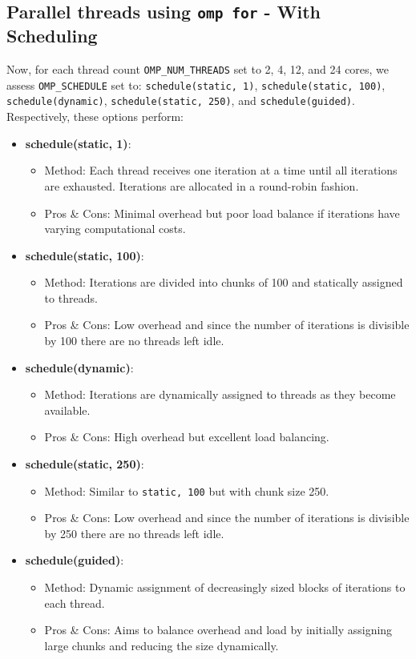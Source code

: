 \documentclass{article}
\begin{document}
\subsection{Parallel threads using \texttt{omp for} - With Scheduling}
Now, for each thread count \texttt{OMP\_NUM\_THREADS} set to 2, 4, 12, and 24 cores, we assess \texttt{OMP\_SCHEDULE} set to: 
\texttt{schedule(static, 1)}, \texttt{schedule(static, 100)}, \texttt{schedule(dynamic)}, \texttt{schedule(static, 250)}, and \texttt{schedule(guided)}. Respectively, 
these options perform:
\begin{itemize}

\item \textbf{schedule(static, 1)}:
  \begin{itemize}
    \item Method: Each thread receives one iteration at a time until all iterations are exhausted. Iterations are allocated in a round-robin fashion.
    \item Pros \& Cons: Minimal overhead but poor load balance if iterations have varying computational costs.
  \end{itemize}

\item \textbf{schedule(static, 100)}:
  \begin{itemize}
    \item Method: Iterations are divided into chunks of 100 and statically assigned to threads.
    \item Pros \& Cons: Low overhead and since the number of iterations is divisible by 100 there are no threads left idle.
  \end{itemize}

\item \textbf{schedule(dynamic)}:
  \begin{itemize}
    \item Method: Iterations are dynamically assigned to threads as they become available.
    \item Pros \& Cons: High overhead but excellent load balancing.
  \end{itemize}

\item \textbf{schedule(static, 250)}:
  \begin{itemize}
    \item Method: Similar to \texttt{static, 100} but with chunk size 250.
    \item Pros \& Cons: Low overhead and since the number of iterations is divisible by 250 there are no threads left idle.
  \end{itemize}

\item \textbf{schedule(guided)}:
  \begin{itemize}
    \item Method: Dynamic assignment of decreasingly sized blocks of iterations to each thread.
    \item Pros \& Cons: Aims to balance overhead and load by initially assigning large chunks and reducing the size dynamically.
  \end{itemize}
\end{itemize}
\end{document}
